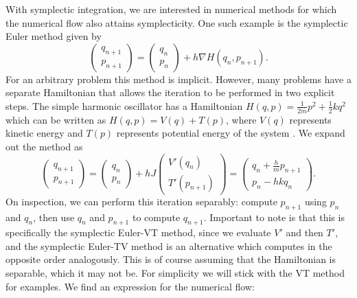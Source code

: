 With symplectic integration, we are interested in numerical methods for which the numerical flow also attains symplecticity.
One such example is the symplectic Euler method \cite{gni2006} given by
\begin{equation*}
	\begin{pmatrix}
		q_{n+1} \\
		p_{n+1} 
	\end{pmatrix} = \begin{pmatrix}
		q_{n} \\
		p_{n}
	\end{pmatrix} + h \nabla H(q_{n}, p_{n+1}).
\end{equation*}
For an arbitrary problem this method is implicit. However, many problems have a separate Hamiltonian that allows the iteration to be performed in two explicit steps. 
The simple harmonic oscillator has a Hamiltonian $H(q, p) = \frac{1}{2m}p^2 + \frac{1}{2}kq^2$ which can be written as $H(q, p) = V(q) + T(p)$, where $V(q)$ represents kinetic energy and $T(p)$ represents potential energy of the system \cite{gni2006, Casas_2016}.
We expand out the method as
\begin{equation*}
	\begin{pmatrix}
		q_{n+1} \\
		p_{n+1} 
	\end{pmatrix} = \begin{pmatrix}
		q_{n} \\
		p_{n}
	\end{pmatrix} + h {J} \begin{pmatrix}
		V'(q_n) \\
		T'(p_{n+1})
	\end{pmatrix} = \begin{pmatrix}
		q_{n} + \frac{h}{m}p_{n+1} \\
		p_{n} - hk q_n
	\end{pmatrix}.
\end{equation*}
On inspection, we can perform this iteration separably: compute $p_{n+1}$ using $p_n$ and $q_n$,
then use $q_n$ and $p_{n+1}$ to compute $q_{n+1}$.
Important to note is that this is specifically the symplectic Euler-VT method, since we evaluate $V'$ and then $T'$,
and the symplectic Euler-TV method is an alternative which computes in the opposite order analogously.
This is of course assuming that the Hamiltonian is separable, which it may not be.
For simplicity we will stick with the VT method for examples.
We find an expression for the numerical flow:
